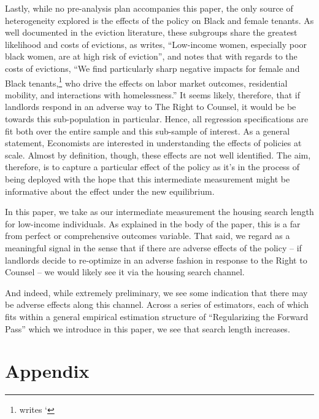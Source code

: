 \documentclass[a4paper,12pt]{article}
\begin{document}
Lastly, while no pre-analysis plan accompanies this paper, the only source of heterogeneity explored is the effects of the policy on Black and female tenants. As well documented in the eviction literature, these subgroups share the greatest likelihood and costs of evictions, as \cite{desmond2019unaffordable} writes, ``Low-income women, especially poor black women, are at high risk of eviction'', and \cite{collinson2022eviction} notes that with regards to the costs of evictions, ``We find particularly sharp negative impacts for female and Black tenants,\footnote{\cite{evans2019reducing} writes `} who drive the effects on labor market outcomes, residential mobility, and interactions with homelessness.'' It seems likely, therefore, that if landlords respond in an adverse way to The Right to Counsel, it would be be towards this sub-population in particular. Hence, all regression specifications are fit both over the entire sample and this sub-sample of interest. 
As a general statement, Economists are interested in understanding the effects of policies at scale. Almost by definition, though, these effects are not well identified. The aim, therefore, is to capture a particular effect of the policy as it's in the process of being deployed with the hope that this intermediate measurement might be informative about the effect under the new equilibrium.\par 
In this paper, we take as our intermediate measurement the housing search length for low-income individuals. As explained in the body of the paper, this is a far from perfect or comprehensive outcomes variable. That said, we regard as a meaningful signal in the sense that if there are adverse effects of the policy -- if landlords decide to re-optimize in an adverse fashion in response to the Right to Counsel -- we would likely see it via the housing search channel. \par 
And indeed, while extremely preliminary, we see some indication that there may be adverse effects along this channel. Across a series of estimators, each of which fits within a general empirical estimation structure of ``Regularizing the Forward Pass'' which we introduce in this paper, we see that search length increases.

%


\section{Appendix}
\end{document}

